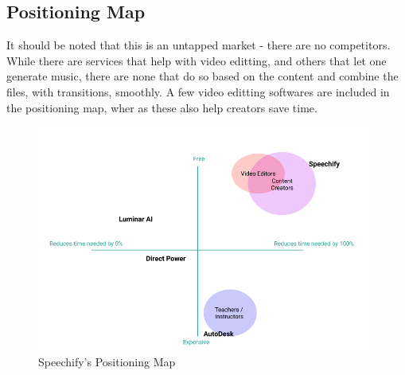 \documentclass[letterpaper]{article}
\begin{document}
    \subsection{Positioning Map}
    It should be noted that this is an untapped market - there are no competitors. While there are services that help with video editting, and others that let one generate music, there are none that do so based on the content and combine the files, with transitions, smoothly. A few video editting softwares are included in the positioning map, wher as these also help creators save time.
    \begin{figure}
        \includegraphics[width=11cm]{PositioningMap}
        \caption{Speechify's Positioning Map}
    \end{figure}
\cleardoublepage
\end{document}

